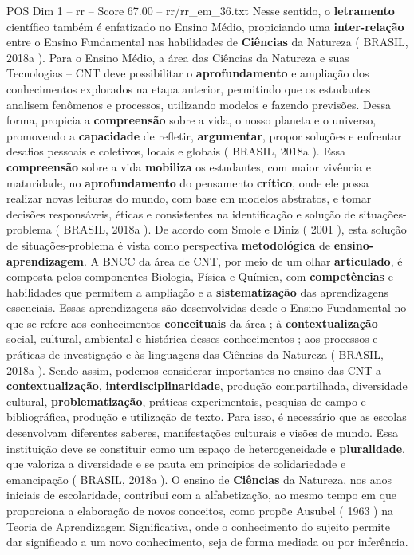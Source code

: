 \begin{textsample}{POS Dim 1 – rr – Score 67.00 – rr/rr\_em\_36.txt}
Nesse sentido, o \textbf{letramento} científico também é enfatizado no Ensino Médio, propiciando uma \textbf{inter-relação} entre o Ensino Fundamental nas habilidades de \textbf{Ciências} da Natureza ( BRASIL, 2018a ).
Para o Ensino Médio, a área das Ciências da Natureza e suas Tecnologias – CNT deve possibilitar o \textbf{aprofundamento} e ampliação dos conhecimentos explorados na etapa anterior, permitindo que os estudantes analisem fenômenos e processos, utilizando modelos e fazendo previsões.
Dessa forma, propicia a \textbf{compreensão} sobre a vida, o nosso planeta e o universo, promovendo a \textbf{capacidade} de refletir, \textbf{argumentar}, propor soluções e enfrentar desafios pessoais e coletivos, locais e globais ( BRASIL, 2018a ).
Essa \textbf{compreensão} sobre a vida \textbf{mobiliza} os estudantes, com maior vivência e maturidade, no \textbf{aprofundamento} do pensamento \textbf{crítico}, onde ele possa realizar novas leituras do mundo, com base em modelos abstratos, e tomar decisões responsáveis, éticas e consistentes na identificação e solução de situações-problema ( BRASIL, 2018a ).
De acordo com Smole e Diniz ( 2001 ), esta solução de situações-problema é vista como perspectiva \textbf{metodológica} de \textbf{ensino-aprendizagem}.
A BNCC da área de CNT, por meio de um olhar \textbf{articulado}, é composta pelos componentes Biologia, Física e Química, com \textbf{competências} e habilidades que permitem a ampliação e a \textbf{sistematização} das aprendizagens essenciais.
Essas aprendizagens são desenvolvidas desde o Ensino Fundamental no que se refere aos conhecimentos \textbf{conceituais} da área ; à \textbf{contextualização} social, cultural, ambiental e histórica desses conhecimentos ; aos processos e práticas de investigação e às linguagens das Ciências da Natureza ( BRASIL, 2018a ).
Sendo assim, podemos considerar importantes no ensino das CNT a \textbf{contextualização}, \textbf{interdisciplinaridade}, produção compartilhada, diversidade cultural, \textbf{problematização}, práticas experimentais, pesquisa de campo e bibliográfica, produção e utilização de texto.
Para isso, é necessário que as escolas desenvolvam diferentes saberes, manifestações culturais e visões de mundo.
Essa instituição deve se constituir como um espaço de heterogeneidade e \textbf{pluralidade}, que valoriza a diversidade e se pauta em princípios de solidariedade e emancipação ( BRASIL, 2018a ).
O ensino de \textbf{Ciências} da Natureza, nos anos iniciais de escolaridade, contribui com a alfabetização, ao mesmo tempo em que proporciona a elaboração de novos conceitos, como propõe Ausubel ( 1963 ) na Teoria de Aprendizagem Significativa, onde o conhecimento do sujeito permite dar significado a um novo conhecimento, seja de forma mediada ou por inferência.

\end{textsample}
